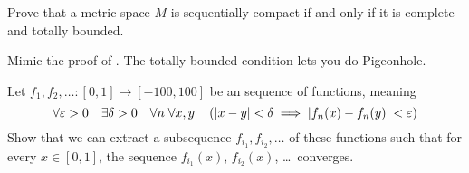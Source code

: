 \begin{dproblem}
	\gim
	Prove that a metric space $M$ is sequentially compact
	if and only if it is complete and totally bounded.
	\label{thm:bzw}
	\begin{hint}
		Mimic the proof of .
		The totally bounded condition lets you do Pigeonhole.
	\end{hint}
\end{dproblem}

\begin{problem}
	\gim
	Let
	$f_1, f_2, \ldots \colon [0,1] \to [-100,100]$
	be an  sequence of functions, meaning
	\[
		\forall \varepsilon > 0 \quad
		\exists \delta > 0 \quad
		\forall n \; 
		\forall x,y \quad
		\left( \left\lvert x-y \right\rvert <\delta
		\implies \left\lvert f_n(x) - f_n(y) \right\rvert < \varepsilon \right)
	\]
	Show that we can extract a subsequence $f_{i_1}, f_{i_2}, \dots$
	of these functions such that for every $x \in [0,1]$,
	the sequence $f_{i_1}(x)$, $f_{i_2}(x)$, \dots\ converges.
\end{problem}

